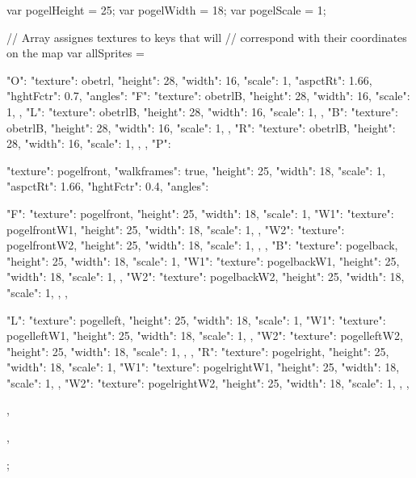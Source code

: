 var pogelHeight = 25;
var pogelWidth =  18;
var pogelScale =  1;


// Array assignes textures to keys that will
// correspond with their coordinates on the map
var allSprites = {
  "O": {
    "texture": obetrl,
    "height": 28,
    "width": 16,
    "scale": 1,
    "aspctRt": 1.66,
    "hghtFctr": 0.7,
    "angles":{
      "F": {
        "texture": obetrlB,
        "height": 28,
        "width": 16,
        "scale": 1,
      },
      "L": {
        "texture": obetrlB,
        "height": 28,
        "width": 16,
        "scale": 1,
      },
      "B": {
        "texture": obetrlB,
        "height": 28,
        "width": 16,
        "scale": 1,
      },
      "R": {
        "texture": obetrlB,
        "height": 28,
        "width": 16,
        "scale": 1,
      },
    }
  },
  "P": {
    "texture": pogelfront,
    "walkframes": true,
    "height": 25,
    "width": 18,
    "scale": 1,
    "aspctRt": 1.66,
    "hghtFctr": 0.4,
    "angles":{
      "F": {
        "texture": pogelfront,
        "height": 25,
        "width": 18,
        "scale": 1,
        "W1": {
          "texture": pogelfrontW1,
          "height": 25,
          "width": 18,
          "scale": 1,
        },
        "W2": {
          "texture": pogelfrontW2,
          "height": 25,
          "width": 18,
          "scale": 1,
        },
      },
      "B": {
        "texture": pogelback,
        "height": 25,
        "width": 18,
        "scale": 1,
        "W1": {
          "texture": pogelbackW1,
          "height": 25,
          "width": 18,
          "scale": 1,
        },
        "W2": {
          "texture": pogelbackW2,
          "height": 25,
          "width": 18,
          "scale": 1,
        },
      },

      "L": {
        "texture": pogelleft,
        "height": 25,
        "width": 18,
        "scale": 1,
        "W1": {
          "texture": pogelleftW1,
          "height": 25,
          "width": 18,
          "scale": 1,
        },
        "W2": {
          "texture": pogelleftW2,
          "height": 25,
          "width": 18,
          "scale": 1,
        },
      },
      "R": {
        "texture": pogelright,
        "height": 25,
        "width": 18,
        "scale": 1,
        "W1": {
          "texture": pogelrightW1,
          "height": 25,
          "width": 18,
          "scale": 1,
        },
        "W2": {
          "texture": pogelrightW2,
          "height": 25,
          "width": 18,
          "scale": 1,
        },
      },
    },
  },
};

